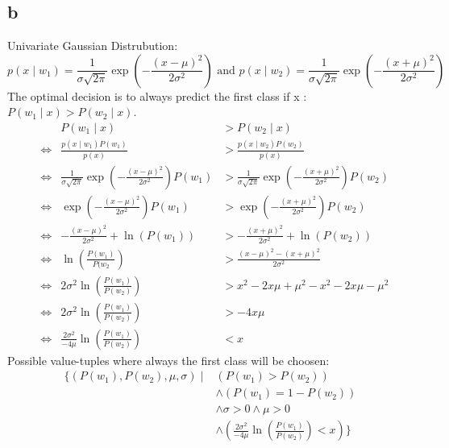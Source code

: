 \subsection{b}
Univariate Gaussian Distrubution:
$$p(x\mid w_1) = \frac{1}{\sigma\sqrt{2\pi}}\exp\left(-\frac{(x - \mu)^2}{2\sigma^2}\right) \textrm{ and } p(x\mid w_2) = \frac{1}{\sigma\sqrt{2\pi}}\exp\left(-\frac{(x + \mu)^2}{2\sigma^2}\right)$$
The optimal decision is to always predict the first class if \forall x \in {}:   $P(w_1\mid x) > P(w_2 \mid x)$.
\begin{align*}
&& P(w_1 \mid x) &> P(w_2 \mid x) \\
&\Leftrightarrow &\frac{p(x \mid w_1)P(w_1)}{p(x)} &> \frac{p(x \mid w_2)P(w_2)}{p(x)} \\
&\Leftrightarrow &\frac{1}{\sigma\sqrt{2\pi}}\exp\left(-\frac{(x - \mu)^2}{2\sigma^2}\right)P(w_1) &> \frac{1}{\sigma\sqrt{2\pi}}\exp\left(-\frac{(x + \mu)^2}{2\sigma^2}\right)P(w_2) \\
&\Leftrightarrow &\exp\left(-\frac{(x - \mu)^2}{2\sigma^2}\right)P(w_1) &> \exp\left(-\frac{(x + \mu)^2}{2\sigma^2}\right)P(w_2) \\
&\Leftrightarrow &-\frac{(x - \mu)^2}{2\sigma^2} + \ln\left(P(w_1)\right) &> -\frac{(x + \mu)^2}{2\sigma^2} + \ln\left(P(w_2)\right) \\
&\Leftrightarrow &\ln\left(\frac{P(w_1)}{P(w_2}\right) &> \frac{(x - \mu)^2 - (x + \mu)^2}{2\sigma^2}\\
&\Leftrightarrow &2\sigma^2\ln\left(\frac{P(w_1)}{P(w_2)}\right) &> x^2 - 2x\mu + \mu^2 - x^2 - 2x\mu - \mu^2 \\
&\Leftrightarrow &2\sigma^2\ln\left(\frac{P(w_1)}{P(w_2)}\right) &> -4x\mu \\
&\Leftrightarrow &\frac{2\sigma^2}{-4\mu}\ln\left(\frac{P(w_1)}{P(w_2)}\right) &< x
\end{align*}
Possible value-tuples where always the first class will be choosen:
\begin{align*}
\{ (P(w_1), P(w_2), \mu, \sigma) \mid &(P(w_1) > P(w_2)) \\
&\land (P(w_1) = 1-P(w_2)) \\
&\land \sigma>0 \land \mu>0 \\ 
&\land (\frac{2\sigma^2}{-4\mu}\ln\left(\frac{P(w_1)}{P(w_2)}\right) < x) \}
\end{align*}